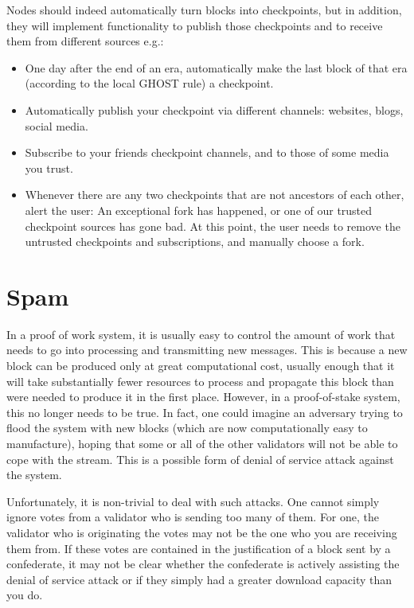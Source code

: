 \documentclass[12pt, fleqn]{article}
\begin{document}
Nodes should indeed automatically turn blocks into checkpoints, but in addition, they will implement functionality to publish those checkpoints and to receive them from different sources e.g.:
\begin{itemize}
  \item One day after the end of an era, automatically make the last block of that era (according to the local GHOST rule) a checkpoint.
  \item Automatically publish your checkpoint via different channels: websites, blogs, social media.
  \item Subscribe to your friends checkpoint channels, and to those of some media you trust.
  \item Whenever there are any two checkpoints that are not ancestors of each other, alert the user: An exceptional fork has happened, or one of our trusted checkpoint sources has gone bad. At this point, the user needs to remove the untrusted checkpoints and subscriptions, and manually choose a fork.
\end{itemize}

\section{Spam}

In a proof of work system, it is usually easy to control the amount of work that needs to go into processing and transmitting new messages. This is because a new block can be produced only at great computational cost, usually enough that it will take substantially fewer resources to process and propagate this block than were needed to produce it in the first place. However, in a proof-of-stake system, this no longer needs to be true. In fact, one could imagine an adversary trying to flood the system with new blocks (which are now computationally easy to manufacture), hoping that some or all of the other validators will not be able to cope with the stream. This is a possible form of denial of service attack against the system.

Unfortunately, it is non-trivial to deal with such attacks. One cannot simply ignore votes from a validator who is sending too many of them. For one, the validator who is originating the votes may not be the one who you are receiving them from. If these votes are contained in the justification of a block sent by a confederate, it may not be clear whether the confederate is actively assisting the denial of service attack or if they simply had a greater download capacity than you do.
\end{document}
